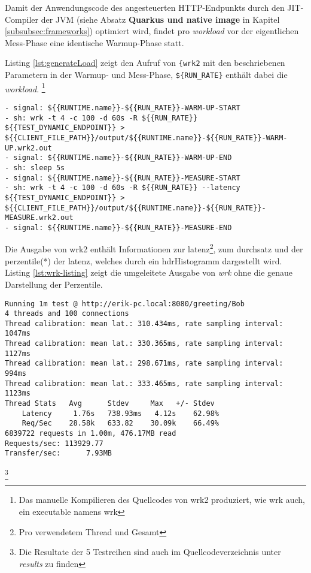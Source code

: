Damit der Anwendungscode des angesteuerten HTTP-Endpunkts durch den JIT-Compiler der JVM (siehe Absatz \textbf{Quarkus und native image} in Kapitel
\ref{subsubsec:frameworks}) optimiert wird, findet pro \textit{workload} vor der eigentlichen Mess-Phase eine identische Warmup-Phase statt.

Listing \ref*{lst:generateLoad} zeigt den Aufruf von \verb|{wrk2| mit den beschriebenen Parametern in der Warmup- und Mess-Phase,
\verb|${RUN_RATE}| enthält dabei die \textit{workload}.
\footnote{Das manuelle Kompilieren des Quellcodes von wrk2 produziert, wie wrk auch, ein executable namens wrk}

\begin{lstlisting}[caption=Auszug des qDup Skripts generate load, captionpos=b, label=lst:generateLoad]
- signal: ${{RUNTIME.name}}-${{RUN_RATE}}-WARM-UP-START
- sh: wrk -t 4 -c 100 -d 60s -R ${{RUN_RATE}} ${{TEST_DYNAMIC_ENDPOINT}} > ${{CLIENT_FILE_PATH}}/output/${{RUNTIME.name}}-${{RUN_RATE}}-WARM-UP.wrk2.out
- signal: ${{RUNTIME.name}}-${{RUN_RATE}}-WARM-UP-END
- sh: sleep 5s
- signal: ${{RUNTIME.name}}-${{RUN_RATE}}-MEASURE-START
- sh: wrk -t 4 -c 100 -d 60s -R ${{RUN_RATE}} --latency ${{TEST_DYNAMIC_ENDPOINT}} > ${{CLIENT_FILE_PATH}}/output/${{RUNTIME.name}}-${{RUN_RATE}}-MEASURE.wrk2.out
- signal: ${{RUNTIME.name}}-${{RUN_RATE}}-MEASURE-END
   \end{lstlisting}

Die Ausgabe von wrk2 enthält Informationen zur \Gls{latenz}\footnote{Pro verwendetem Thread und Gesamt},
zum \Gls{durchsatz} und der \Gls{perzentile}(*) der \Gls{latenz}, welches durch ein \Gls{hdrHistogramm} dargestellt wird.
Listing \ref*{lst:wrk-listing} zeigt die umgeleitete Ausgabe von \textit{wrk} ohne die genaue Darstellung der Perzentile.

\begin{lstlisting}[caption=Beispiel für Ausgabe von wrk,captionpos=b, label=lst:wrk-listing]
Running 1m test @ http://erik-pc.local:8080/greeting/Bob
4 threads and 100 connections
Thread calibration: mean lat.: 310.434ms, rate sampling interval: 1047ms
Thread calibration: mean lat.: 330.365ms, rate sampling interval: 1127ms
Thread calibration: mean lat.: 298.671ms, rate sampling interval: 994ms
Thread calibration: mean lat.: 333.465ms, rate sampling interval: 1123ms
Thread Stats   Avg      Stdev     Max   +/- Stdev
	Latency     1.76s   738.93ms   4.12s    62.98%
	Req/Sec    28.58k   633.82    30.09k    66.49%
6839722 requests in 1.00m, 476.17MB read
Requests/sec: 113929.77
Transfer/sec:      7.93MB
\end{lstlisting}\footnote{Die Resultate der 5 Testreihen sind auch im Quellcodeverzeichnis unter \textit{\/results} zu finden}

